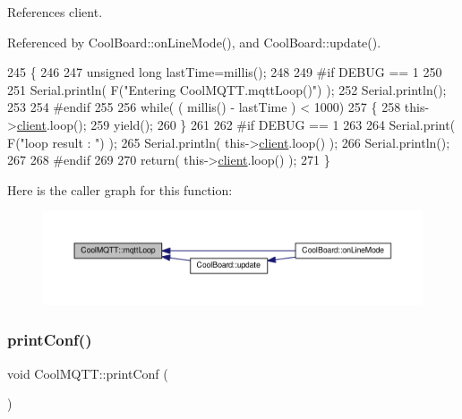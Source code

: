 References client.



Referenced by Cool\+Board\+::on\+Line\+Mode(), and Cool\+Board\+::update().


\begin{DoxyCode}
245 \{
246 
247     \textcolor{keywordtype}{unsigned} \textcolor{keywordtype}{long} lastTime=millis();
248 
249 \textcolor{preprocessor}{#if DEBUG == 1}
250 
251     Serial.println( F(\textcolor{stringliteral}{"Entering CoolMQTT.mqttLoop()"}) );
252     Serial.println();
253 
254 \textcolor{preprocessor}{#endif  }
255 
256     \textcolor{keywordflow}{while}( ( millis() - lastTime ) < 1000)
257     \{
258         this->\hyperlink{classCoolMQTT_a4ca71e4f76ef868692a297efd45b1415}{client}.loop();
259         yield();
260     \}
261 
262 \textcolor{preprocessor}{#if DEBUG == 1 }
263     
264     Serial.print( F(\textcolor{stringliteral}{"loop result : "}) );
265     Serial.println( this->\hyperlink{classCoolMQTT_a4ca71e4f76ef868692a297efd45b1415}{client}.loop() );
266     Serial.println();
267 
268 \textcolor{preprocessor}{#endif}
269 
270     \textcolor{keywordflow}{return}( this->\hyperlink{classCoolMQTT_a4ca71e4f76ef868692a297efd45b1415}{client}.loop() );
271 \}
\end{DoxyCode}
Here is the caller graph for this function\+:\nopagebreak
\begin{figure}[H]
\begin{center}
\leavevmode
\includegraphics[width=350pt]{classCoolMQTT_aa5eaae967b562b62cbcf2b8d81f6e5d5_icgraph}
\end{center}
\end{figure}
\mbox{\label{classCoolMQTT_a40553a0ad4b5ecf1cb4411ab54ca85fb}} 
\subsubsection{\texorpdfstring{print\+Conf()}{printConf()}}
{\footnotesize\ttfamily void Cool\+M\+Q\+T\+T\+::print\+Conf (\begin{DoxyParamCaption}{ }\end{DoxyParamCaption})}

